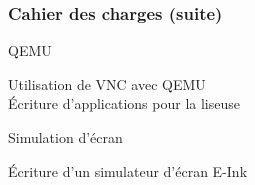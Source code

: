 \begin{frame}

\frametitle{Cahier des charges (suite)}


\begin{block}{QEMU}

Utilisation de VNC avec QEMU\\

Écriture d'applications pour la liseuse\\
\end{block}


\begin{block}{Simulation d'écran}

Écriture d'un simulateur d'écran E-Ink\\

\end{block}


\end{frame}
